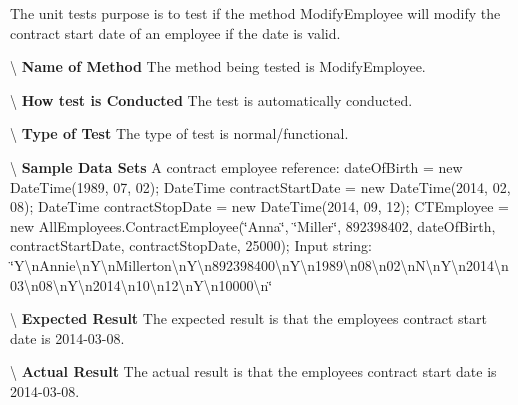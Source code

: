The unit test\textquotesingle{}s purpose is to test if the method Modify\+Employee will modify the contract start date of an employee if the date is valid. 

\textbackslash{} {\bfseries  Name of Method} The method being tested is Modify\+Employee.

\textbackslash{} {\bfseries  How test is Conducted} The test is automatically conducted.

\textbackslash{} {\bfseries  Type of Test} The type of test is normal/functional.

\textbackslash{} {\bfseries  Sample Data Sets} A contract employee reference\+: date\+Of\+Birth = new Date\+Time(1989, 07, 02); Date\+Time contract\+Start\+Date = new Date\+Time(2014, 02, 08); Date\+Time contract\+Stop\+Date = new Date\+Time(2014, 09, 12); C\+T\+Employee = new All\+Employees.\+Contract\+Employee(\char`\"{}\+Anna\char`\"{}, \char`\"{}\+Miller\char`\"{}, 892398402, date\+Of\+Birth, contract\+Start\+Date, contract\+Stop\+Date, 25000); Input string\+: \char`\"{}\+Y\textbackslash{}n\+Annie\textbackslash{}n\+Y\textbackslash{}n\+Millerton\textbackslash{}n\+Y\textbackslash{}n892398400\textbackslash{}n\+Y\textbackslash{}n1989\textbackslash{}n08\textbackslash{}n02\textbackslash{}n\+N\textbackslash{}n\+Y\textbackslash{}n2014\textbackslash{}n03\textbackslash{}n08\textbackslash{}n\+Y\textbackslash{}n2014\textbackslash{}n10\textbackslash{}n12\textbackslash{}n\+Y\textbackslash{}n10000\textbackslash{}n\char`\"{}

\textbackslash{} {\bfseries  Expected Result} The expected result is that the employee\textquotesingle{}s contract start date is 2014-\/03-\/08.

\textbackslash{} {\bfseries  Actual Result} The actual result is that the employee\textquotesingle{}s contract start date is 2014-\/03-\/08. \hypertarget{class_the_company_1_1_tests_1_1_modify_employee_tests_ad6e8eaf73cd1ed44d4c49f8253033283}{}
